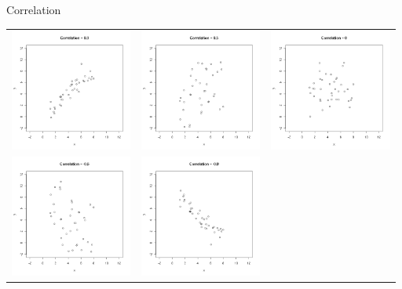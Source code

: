 \begin{frame}{Correlation}

  \hspace*{-3em}
  \begin{tabular}{rrr}
    \includegraphics[height=4cm]{img/correlation09} & 
    \includegraphics[height=4cm]{img/correlation05} &
    \includegraphics[height=4cm]{img/correlation0} \\
    \includegraphics[height=4cm]{img/correlation-05} &
    \includegraphics[height=4cm]{img/correlation-09}
  \end{tabular}


\end{frame}


